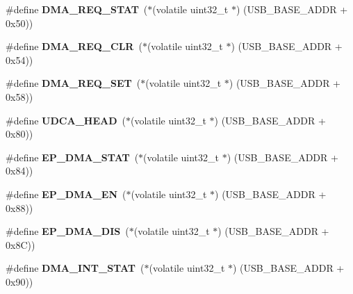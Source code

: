 \begin{DoxyCompactItemize}
\item 
\mbox{\label{group__lpc24xx__regs_ga863b30fbbd61bf5fee46a92cfe7c5752}} 
\#define {\bfseries D\+M\+A\+\_\+\+R\+E\+Q\+\_\+\+S\+T\+AT}~($\ast$(volatile uint32\+\_\+t $\ast$) (U\+S\+B\+\_\+\+B\+A\+S\+E\+\_\+\+A\+D\+DR + 0x50))
\item 
\mbox{\label{group__lpc24xx__regs_ga1831db54b9f28fc5a38f131c8194250e}} 
\#define {\bfseries D\+M\+A\+\_\+\+R\+E\+Q\+\_\+\+C\+LR}~($\ast$(volatile uint32\+\_\+t $\ast$) (U\+S\+B\+\_\+\+B\+A\+S\+E\+\_\+\+A\+D\+DR + 0x54))
\item 
\mbox{\label{group__lpc24xx__regs_gac0c92edce81c96089cdcad7863904d7f}} 
\#define {\bfseries D\+M\+A\+\_\+\+R\+E\+Q\+\_\+\+S\+ET}~($\ast$(volatile uint32\+\_\+t $\ast$) (U\+S\+B\+\_\+\+B\+A\+S\+E\+\_\+\+A\+D\+DR + 0x58))
\item 
\mbox{\label{group__lpc24xx__regs_ga032486c794ec5177f8798c52cd668f06}} 
\#define {\bfseries U\+D\+C\+A\+\_\+\+H\+E\+AD}~($\ast$(volatile uint32\+\_\+t $\ast$) (U\+S\+B\+\_\+\+B\+A\+S\+E\+\_\+\+A\+D\+DR + 0x80))
\item 
\mbox{\label{group__lpc24xx__regs_ga27824852fe89c5316589c925f4e1b5da}} 
\#define {\bfseries E\+P\+\_\+\+D\+M\+A\+\_\+\+S\+T\+AT}~($\ast$(volatile uint32\+\_\+t $\ast$) (U\+S\+B\+\_\+\+B\+A\+S\+E\+\_\+\+A\+D\+DR + 0x84))
\item 
\mbox{\label{group__lpc24xx__regs_gaca707e6ffdc202147005652a1b544193}} 
\#define {\bfseries E\+P\+\_\+\+D\+M\+A\+\_\+\+EN}~($\ast$(volatile uint32\+\_\+t $\ast$) (U\+S\+B\+\_\+\+B\+A\+S\+E\+\_\+\+A\+D\+DR + 0x88))
\item 
\mbox{\label{group__lpc24xx__regs_ga973e11abfa4de0e431d8312c0a383707}} 
\#define {\bfseries E\+P\+\_\+\+D\+M\+A\+\_\+\+D\+IS}~($\ast$(volatile uint32\+\_\+t $\ast$) (U\+S\+B\+\_\+\+B\+A\+S\+E\+\_\+\+A\+D\+DR + 0x8\+C))
\item 
\mbox{\label{group__lpc24xx__regs_gaa5cff2a6f8869e960806889e2e50e4fb}} 
\#define {\bfseries D\+M\+A\+\_\+\+I\+N\+T\+\_\+\+S\+T\+AT}~($\ast$(volatile uint32\+\_\+t $\ast$) (U\+S\+B\+\_\+\+B\+A\+S\+E\+\_\+\+A\+D\+DR + 0x90))

\end{DoxyCompactItemize}
